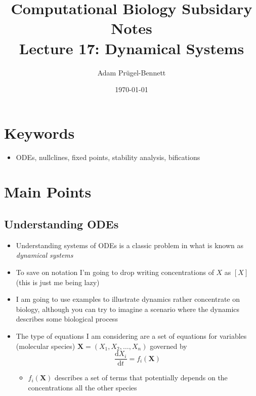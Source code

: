 \documentclass[11pt]{article}
\author{Adam Prügel-Bennett}
\date{\today}
\title{Computational Biology Subsidary Notes\\\medskip
\large Lecture 17: Dynamical Systems}
\newcommand{\dd}{\mathrm{d}}
\begin{document}
\maketitle

\section{Keywords}
\label{sec:org3176690}
\begin{itemize}
\item ODEs, nullclines, fixed points, stability analysis, bifications
\end{itemize}

\section{Main Points}
\label{sec:orgc1a9626}

\subsection{Understanding ODEs}
\label{sec:org0c4dff3}
\begin{itemize}
\item Understanding systems of ODEs is a classic problem in what is
known as \emph{dynamical systems}
\item To save on notation I'm going to drop writing concentrations of
\(X\) as \([X]\) (this is just me being lazy)
\item I am going to use examples to illustrate dynamics rather
concentrate on biology, although you can try to imagine a
scenario where the dynamics describes some biological process
\item The type of equations I am considering are a set of equations for
variables (molecular species) \(\bm{X}=(X_1,X_2,\ldots,X_n)\)
governed by
\[ \frac{\dd X_i}{\dd t} = f_i(\bm{X}) \]
\begin{itemize}
\item \(f_i(\bm{X})\) describes a set of terms that potentially depends
on the concentrations all the other species
\end{itemize}
\end{itemize}
\end{document}
